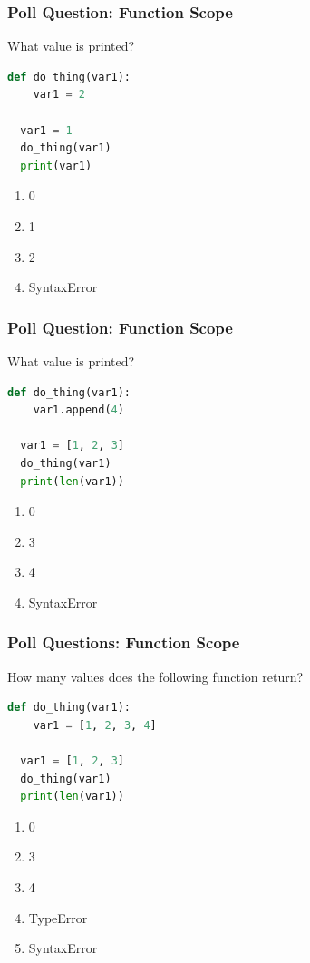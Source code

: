 \documentclass{beamer}
\begin{document}
%
%
\begin{frame}[fragile]
  \frametitle{Poll Question: Function Scope}
  What value is printed?
  \begin{lstlisting}[language=Python, autogobble]
  def do_thing(var1):
    var1 = 2

  var1 = 1
  do_thing(var1)
  print(var1)
  \end{lstlisting}
  \vfill
  \begin{enumerate}[A]
    \item 0
    \item 1 %
    \item 2
    \item SyntaxError
  \end{enumerate}
\end{frame}


%
%
\begin{frame}[fragile]
  \frametitle{Poll Question: Function Scope}
  What value is printed?
  \begin{lstlisting}[language=Python, autogobble]
  def do_thing(var1):
    var1.append(4)

  var1 = [1, 2, 3]
  do_thing(var1)
  print(len(var1))
  \end{lstlisting}
  \vfill
  \begin{enumerate}[A]
    \item 0
    \item 3
    \item 4 %
    \item SyntaxError
  \end{enumerate}
\end{frame}

%
%
\begin{frame}[fragile]
  \frametitle{Poll Questions: Function Scope}
  How many values does the following function return?
  \begin{lstlisting}[language=Python, autogobble]
  def do_thing(var1):
    var1 = [1, 2, 3, 4]

  var1 = [1, 2, 3]
  do_thing(var1)
  print(len(var1))
  \end{lstlisting}
  \vfill
  \begin{enumerate}[A]
    \item 0
    \item 3 %
    \item 4
    \item TypeError
    \item SyntaxError
  \end{enumerate}
\end{frame}
\end{document}
